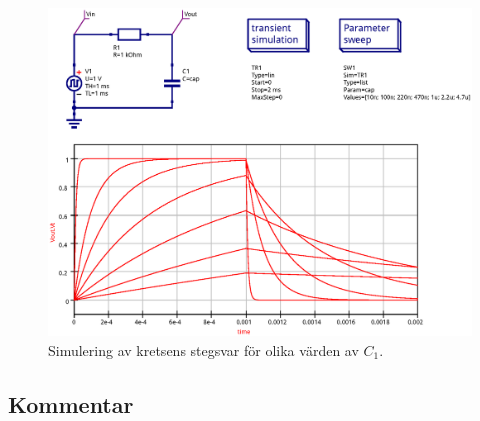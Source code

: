 \begin{figure}[ht]\label{fig:step-sim-param}
  \centering
  \includegraphics[width=\linewidth]{sim/ee466_lab-4_prj/uppgift-2_param}
  \caption[] {Simulering av kretsens stegsvar för olika värden av $C_1$.}
\end{figure}


\subsection{Kommentar}\label{}

